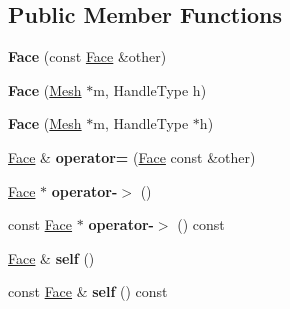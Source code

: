 \subsection*{Public Member Functions}
\begin{DoxyCompactItemize}
\item 
\hypertarget{classINMOST_1_1Face_a53034833744bd5d87a3ae6d933651145}{{\bfseries Face} (const \hyperlink{classINMOST_1_1Face}{Face} \&other)}\label{classINMOST_1_1Face_a53034833744bd5d87a3ae6d933651145}

\item 
\hypertarget{classINMOST_1_1Face_acb563a6337c86a4cf94a710e4e999713}{{\bfseries Face} (\hyperlink{classINMOST_1_1Mesh}{Mesh} $\ast$m, Handle\-Type h)}\label{classINMOST_1_1Face_acb563a6337c86a4cf94a710e4e999713}

\item 
\hypertarget{classINMOST_1_1Face_a9e972af360efe84b5024c5462b6febc8}{{\bfseries Face} (\hyperlink{classINMOST_1_1Mesh}{Mesh} $\ast$m, Handle\-Type $\ast$h)}\label{classINMOST_1_1Face_a9e972af360efe84b5024c5462b6febc8}

\item 
\hypertarget{classINMOST_1_1Face_a6a6f3c1fbe976e4190b65ef840761963}{\hyperlink{classINMOST_1_1Face}{Face} \& {\bfseries operator=} (\hyperlink{classINMOST_1_1Face}{Face} const \&other)}\label{classINMOST_1_1Face_a6a6f3c1fbe976e4190b65ef840761963}

\item 
\hypertarget{classINMOST_1_1Face_a230d80b0f802ce707bba105de43b9245}{\hyperlink{classINMOST_1_1Face}{Face} $\ast$ {\bfseries operator-\/$>$} ()}\label{classINMOST_1_1Face_a230d80b0f802ce707bba105de43b9245}

\item 
\hypertarget{classINMOST_1_1Face_aab957de5751d121cd10b1d397bd97986}{const \hyperlink{classINMOST_1_1Face}{Face} $\ast$ {\bfseries operator-\/$>$} () const }\label{classINMOST_1_1Face_aab957de5751d121cd10b1d397bd97986}

\item 
\hypertarget{classINMOST_1_1Face_a9048c2c08180e0e4808a2f3f6ea1c144}{\hyperlink{classINMOST_1_1Face}{Face} \& {\bfseries self} ()}\label{classINMOST_1_1Face_a9048c2c08180e0e4808a2f3f6ea1c144}

\item 
\hypertarget{classINMOST_1_1Face_a4485c40611961b928f525a729990c65a}{const \hyperlink{classINMOST_1_1Face}{Face} \& {\bfseries self} () const }\label{classINMOST_1_1Face_a4485c40611961b928f525a729990c65a}


\end{DoxyCompactItemize}

